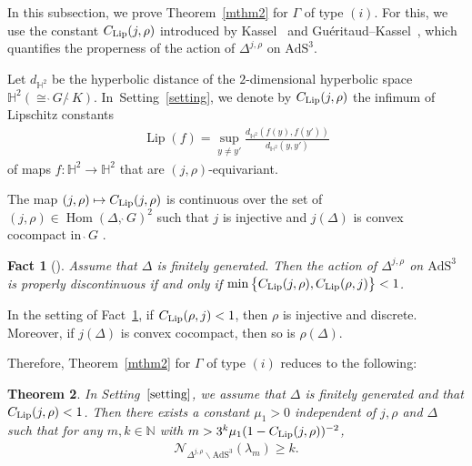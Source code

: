 \documentclass[pdftex]{sigma}
\numberwithin{equation}{section}
\newtheorem{Theorem}{Theorem}[section]
\newtheorem{Fact}[Theorem]{Fact}
 { \theoremstyle{definition}
\newtheorem{Definition}[Theorem]{Definition}
\newtheorem{Note}[Theorem]{Note}
\newtheorem{Example}[Theorem]{Example}
\newtheorem{Remark}[Theorem]{Remark}
\newtheorem{Setting}[Theorem]{Setting}
\newtheorem{Notation}[Theorem]{Notation}
}
\begin{document}
In this subsection, we prove Theorem~\ref{mthm2} for $\Gamma$ of type $(i)$.
For this, we use the constant $C_{\rm Lip}(j,\rho)$
introduced by Kassel~\cite{Ka09} and Gu\'eritaud--Kassel~\cite{GuKa17},
which quantifies the properness of the action
of $\Delta^{j,\rho}$ on $\mathrm{AdS}^{3}$.

\begin{Definition}
\label{def-lip}
Let $d_{\mathbb{H}^{2}}$ be the hyperbolic distance of
the $2$-dimensional hyperbolic space \mbox{$\mathbb{H}^{2}(\cong\grave{\ }G/\grave{\ }K)$}. In~Setting~\ref{setting},
we denote by $C_{\rm Lip}(j,\rho)$ the infimum of Lipschitz constants
\begin{gather*}
\operatorname{Lip}(f)=\sup_{y\neq y'}\frac{d_{\mathbb{H}^{2}}(f(y),f(y'))}{d_{\mathbb{H}^{2}}(y,y')}
\end{gather*}
of maps $f\colon \mathbb{H}^{2} \rightarrow \mathbb{H}^{2}$
that are $(j,\rho)$-equivariant.
\end{Definition}
The map $(j,\rho) \mapsto C_{\rm Lip}(j,\rho)$
is continuous over the set of
$(j,\rho)\in\operatorname{Hom}(\Delta,\grave{\ }G)^{2}$
such that $j$ is injective and $j(\Delta)$ is convex cocompact in $\grave{\ }G$
\cite[Proposition~1.5]{GuKa17}.
\begin{Fact}[\cite{GuKa17,Ka09}]
\label{proper}
Assume that $\Delta$ is finitely generated.
Then the action of $\Delta^{j,\rho}$ on $\mathrm{AdS}^{3}$ is pro\-perly discontinuous
if and only if $\operatorname{min}\big\{C_{\rm Lip}(j,\rho),C_{\rm Lip}(\rho,j)\big\} < 1$.
\end{Fact}

\begin{Remark}
In the setting of Fact~\ref{proper},
if $C_{\rm Lip}(\rho,j)<1$, then $\rho$ is injective and discrete.
Moreover, if $j(\Delta)$ is convex cocompact, then so is $\rho(\Delta)$.
\end{Remark}
Therefore,
Theorem~\ref{mthm2} for $\Gamma$ of type $(i)$
reduces to the following:
\begin{Theorem}
\label{non-standard}
In Setting~$\ref{setting}$, we assume that
$\Delta$ is finitely generated and that $C_{\rm Lip}(j,\rho) < 1$.
Then there exists a constant $\mu_{1}>0$ independent of $j,\rho$ and $\Delta$ such that
for any $m,k\in\mathbb{N}$ with $m > 3^{k}\mu_{1}(1-C_{\rm Lip}(j,\rho))^{-2}$,
\begin{gather*}
\mathcal{N}_{\Delta^{j,\rho}\backslash\mathrm{AdS}^{3}}(\lambda_{m}) \geq k.
\end{gather*}
\end{Theorem}
\end{document}
